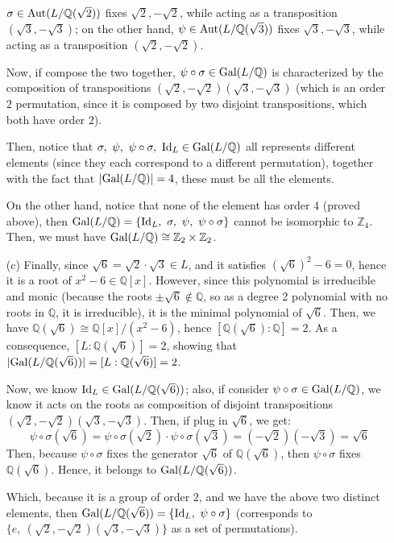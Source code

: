 \documentclass{article}
\newcommand{\ZZ}{\mathbb{Z}}
\newcommand{\QQ}{\mathbb{Q}}
\newcommand{\Id}{\textmd{Id}}
\newcommand{\Gal}{\textmd{Gal}}
\newcommand{\Aut}{\textmd{Aut}}
\begin{document}
\begin{itemize}
    $\sigma\in \Aut(L/\QQ(\sqrt{2}))$ fixes $\sqrt{2},-\sqrt{2}$, while acting as a transposition $(\sqrt{3},-\sqrt{3})$; on the other hand, $\psi\in \Aut(L/\QQ(\sqrt{3}))$ fixes $\sqrt{3},-\sqrt{3}$, while acting as a transposition $(\sqrt{2},-\sqrt{2})$.

    Now, if compose the two together, $\psi\circ \sigma \in \Gal(L/\QQ)$ is characterized by the composition of transpositions $(\sqrt{2},-\sqrt{2})(\sqrt{3},-\sqrt{3})$ (which is an order $2$ permutation, since it is composed by two disjoint transpositions, which both have order $2$).

    Then, notice that $\sigma,\ \psi,\ \psi\circ \sigma,\ \Id_L\in \Gal(L/\QQ)$ all represents different elements (since they each correspond to a different permutation), together with the fact that $|\Gal(L/\QQ)|=4$, these must be all the elements.
    
    On the other hand, notice that none of the element has order $4$ (proved above), then $\Gal(L/\QQ)=\{\Id_L,\ \sigma,\ \psi,\ \psi\circ\sigma\}$ cannot be isomorphic to $\ZZ_4$.
    Then, we must have $\Gal(L/\QQ)\cong \ZZ_2\times \ZZ_2$.

    \item[(c)] Finally, since $\sqrt{6} = \sqrt{2}\cdot\sqrt{3}\in L$, and it satisfies $(\sqrt{6})^2-6=0$, hence it is a root of $x^2-6\in\QQ[x]$. However, since this polynomial is irreducible and monic (because the roots $\pm\sqrt{6}\notin \QQ$, so as a degree 2 polynomial with no roots in $\QQ$, it is irreducible), it is the minimal polynomial of $\sqrt{6}$. Then, we have $\QQ(\sqrt{6})\cong \QQ[x]/(x^2-6)$, hence $[\QQ(\sqrt{6}):\QQ]=2$. As a consequence, $[L:\QQ(\sqrt{6})]=2$, showing that $|\Gal(L/\QQ(\sqrt{6}))|=[L:\QQ(\sqrt{6})]=2$.
    
    Now, we know $\Id_L\in \Gal(L/\QQ(\sqrt{6}))$; also, if consider $\psi\circ\sigma\in \Gal(L/\QQ)$, we know it acts on the roots as composition of disjoint transpositions $(\sqrt{2},-\sqrt{2})(\sqrt{3},-\sqrt{3})$. Then, if plug in $\sqrt{6}$, we get:
    \begin{equation}
        \label{eq:8}
        \psi\circ\sigma(\sqrt{6})=\psi\circ\sigma(\sqrt{2})\cdot\psi\circ\sigma(\sqrt{3}) = (-\sqrt{2})(-\sqrt{3})=\sqrt{6}
    \end{equation}
    Then, because $\psi\circ\sigma$ fixes the generator $\sqrt{6}$ of $\QQ(\sqrt{6})$, then $\psi\circ\sigma$ fixes $\QQ(\sqrt{6})$. Hence, it belongs to $\Gal(L/\QQ(\sqrt{6}))$.

    Which, because it is a group of order $2$, and we have the above two distinct elements, then $\Gal(L/\QQ(\sqrt{6}))=\{\Id_L,\ \psi\circ\sigma\}$ (corresponds to $\{e,\ (\sqrt{2},-\sqrt{2})(\sqrt{3},-\sqrt{3})\}$ as a set of permutations).
\end{itemize}
\end{document}
